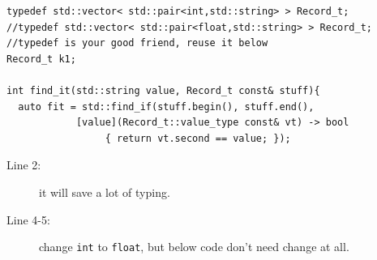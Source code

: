 \documentclass[a4paper,11pt,twoside]{book}
\begin{document}
\begin{itemize}
\begin{lstlisting}
typedef std::vector< std::pair<int,std::string> > Record_t;
//typedef std::vector< std::pair<float,std::string> > Record_t;
//typedef is your good friend, reuse it below
Record_t k1;

int find_it(std::string value, Record_t const& stuff){
  auto fit = std::find_if(stuff.begin(), stuff.end(),
            [value](Record_t::value_type const& vt) -> bool
                 { return vt.second == value; });
\end{lstlisting}
\begin{description}
\item[Line 2:] it will save a lot of typing.

\item[Line 4-5:] change \texttt{int} to \texttt{float}, but below code don't need change at all.
\end{description}

\end{itemize}
\end{document}
